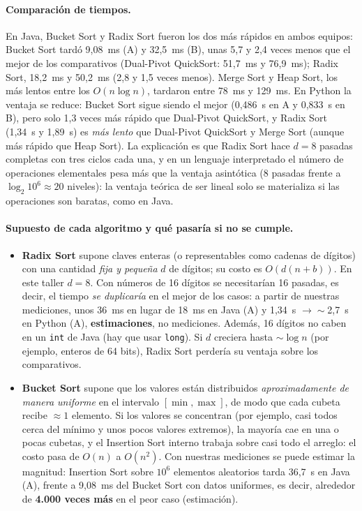 \documentclass[11pt,a4paper]{article}
\newcommand{\code}[1]{\texttt{#1}}
\begin{document}
\paragraph{Comparaci\'on de tiempos.} En Java, Bucket Sort y Radix Sort fueron los dos m\'as r\'apidos en ambos
equipos: Bucket Sort tard\'o 9,08~ms (A) y 32,5~ms (B), unas 5,7 y 2,4 veces menos que el mejor de los
comparativos (Dual-Pivot QuickSort: 51,7~ms y 76,9~ms); Radix Sort, 18,2~ms y 50,2~ms (2,8 y 1,5 veces menos).
Merge Sort y Heap Sort, los m\'as lentos entre los $O(n\log n)$, tardaron entre 78~ms y 129~ms. En
Python la ventaja se reduce: Bucket Sort sigue siendo el mejor (0,486~s en A y 0,833~s en B), pero solo 1,3
veces m\'as r\'apido que Dual-Pivot QuickSort, y Radix Sort (1,34~s y 1,89~s) es \emph{m\'as lento} que Dual-Pivot
QuickSort y Merge Sort (aunque m\'as r\'apido que Heap Sort). La explicaci\'on es que Radix Sort hace
$d=8$ pasadas completas con tres ciclos cada una, y en un lenguaje interpretado el n\'umero de operaciones
elementales pesa m\'as que la ventaja asint\'otica ($8$ pasadas frente a $\log_2 10^6\approx20$ niveles): la
ventaja te\'orica de ser lineal solo se materializa si las operaciones son baratas, como en Java.

\paragraph{Supuesto de cada algoritmo y qu\'e pasar\'ia si no se cumple.}
\begin{itemize}
  \item \textbf{Radix Sort} supone claves enteras (o representables como cadenas de d\'igitos) con una
  cantidad \emph{fija y peque\~na} $d$ de d\'igitos; su costo es $O(d(n+b))$. En este taller $d=8$. Con n\'umeros
  de 16 d\'igitos se necesitar\'ian 16 pasadas, es decir, el tiempo \emph{se duplicar\'ia} en el mejor de los
  casos: a partir de nuestras mediciones, unos 36~ms en lugar de 18~ms en Java (A) y 1,34~s $\to\sim$2,7~s en
  Python (A), \textbf{estimaciones}, no mediciones. Adem\'as, 16 d\'igitos no caben en un \code{int} de Java (hay
  que usar \code{long}). Si $d$ creciera hasta $\sim\log n$ (por ejemplo, enteros de 64 bits), Radix Sort perder\'ia
  su ventaja sobre los comparativos.
  \item \textbf{Bucket Sort} supone que los valores est\'an distribuidos \emph{aproximadamente de manera
  uniforme} en el intervalo $[\min,\max]$, de modo que cada cubeta recibe $\approx1$ elemento. Si los valores
  se concentran (por ejemplo, casi todos cerca del m\'inimo y unos pocos valores extremos), la mayor\'ia cae en
  una o pocas cubetas, y el Insertion Sort interno trabaja sobre casi todo el arreglo: el costo pasa de $O(n)$ a
  $O(n^2)$. Con nuestras mediciones se puede estimar la magnitud: Insertion Sort sobre $10^6$ elementos aleatorios
  tarda 36,7~s en Java (A), frente a 9,08~ms del Bucket Sort con datos uniformes, es decir, alrededor de
  \textbf{4.000 veces m\'as} en el peor caso (estimaci\'on).
\end{itemize}
\end{document}
